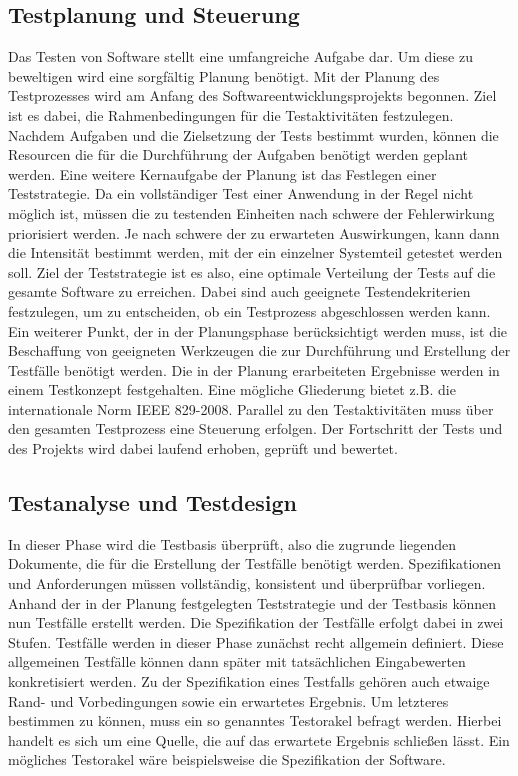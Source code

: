 \subsection{Testplanung und Steuerung}
\label{subsec:testplanung_und_steuerung}
Das Testen von Software stellt eine umfangreiche Aufgabe dar. Um diese zu beweltigen wird eine sorgfältig Planung benötigt.
Mit der Planung des Testprozesses wird am Anfang des Softwareentwicklungsprojekts begonnen.
Ziel ist es dabei, die Rahmenbedingungen für die Testaktivitäten festzulegen.
Nachdem Aufgaben und die Zielsetzung der Tests bestimmt wurden, können die Resourcen die für die Durchführung der Aufgaben benötigt werden geplant werden.
Eine weitere Kernaufgabe der Planung ist das Festlegen einer Teststrategie. Da ein vollständiger Test einer Anwendung in der Regel nicht möglich ist, müssen die zu testenden Einheiten nach schwere der Fehlerwirkung priorisiert werden. Je nach schwere der zu erwarteten Auswirkungen, kann dann die Intensität bestimmt werden, mit der ein einzelner Systemteil getestet werden soll.
Ziel der Teststrategie ist es also, eine optimale Verteilung der Tests auf die gesamte Software zu erreichen.
Dabei sind auch geeignete Testendekriterien festzulegen, um zu entscheiden, ob ein Testprozess abgeschlossen werden kann.
Ein weiterer Punkt, der in der Planungsphase berücksichtigt werden muss, ist die Beschaffung von geeigneten Werkzeugen die zur Durchführung und Erstellung der Testfälle benötigt werden.
Die in der Planung erarbeiteten Ergebnisse werden in einem Testkonzept festgehalten.
Eine mögliche Gliederung bietet z.B. die internationale Norm IEEE 829-2008. \cite{ieee_ieee_2008}
Parallel zu den Testaktivitäten muss über den gesamten Testprozess eine Steuerung erfolgen.
Der Fortschritt der Tests und des Projekts wird dabei laufend erhoben, geprüft und bewertet.

\subsection{Testanalyse und Testdesign}
\label{subsec:testanalyse_und_design}
In dieser Phase wird die Testbasis überprüft, also die zugrunde liegenden Dokumente, die für die Erstellung der Testfälle benötigt werden. Spezifikationen und Anforderungen müssen vollständig, konsistent und überprüfbar vorliegen.
Anhand der in der Planung festgelegten Teststrategie und der Testbasis können nun Testfälle erstellt werden.
Die Spezifikation der Testfälle erfolgt dabei in zwei Stufen. Testfälle werden in dieser Phase zunächst recht allgemein definiert. Diese allgemeinen Testfälle können dann später mit tatsächlichen Eingabewerten konkretisiert werden.
Zu der Spezifikation eines Testfalls gehören auch etwaige Rand- und Vorbedingungen sowie ein erwartetes Ergebnis. Um letzteres bestimmen zu können, muss ein so genanntes Testorakel befragt werden. Hierbei handelt es sich um eine Quelle, die auf das erwartete Ergebnis schließen lässt. Ein mögliches Testorakel wäre beispielsweise die Spezifikation der Software.

